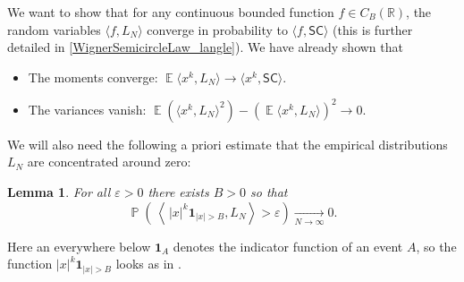 \documentclass[letterpaper,11pt,oneside,reqno]{amsart}
\numberwithin{equation}{section}
\newcommand{\SC}{\mathsf{SC}}
\DeclareMathOperator{\EE}{\mathbb{E}}
\DeclareMathOperator{\PP}{\mathbb{P}}
\newtheorem{lemma}[proposition]{Lemma}
\theoremstyle{definition}
\begin{document}
We want to show that for any continuous bounded function $f\in C_B(\mathbb R)$, the random
variables $\langle f, L_N\rangle$ converge in probability to 
$\langle f, \SC\rangle$ (this is further detailed in \eqref{WignerSemicircleLaw_langle}).
We have already shown that 
\begin{itemize}
	\item The moments converge: $\EE\langle x^{k}, L_N\rangle\to\langle x^k,\SC\rangle$.
	\item The variances
	vanish: 
	$\EE ( \langle x^k , L_N \rangle^2 ) - ( \EE \langle x^k , L_N \rangle )^2 \to0.$
\end{itemize}

We will also need the following a priori estimate that the empirical distributions
$L_N$ are concentrated around zero:
\begin{lemma}\label{lemma:WSCL_truncation}
	For all $ \varepsilon > 0 $ there exists $ B>0 $ so that
	\begin{equation*}
		\PP \left( \, \left \langle \, | x |^k \mathbf{1}_{ | x | > B } , L_N \right \rangle > \varepsilon \right) \xrightarrow[ N \to \infty ]{} 0.
	\end{equation*}
\end{lemma}
Here an everywhere below $\mathbf{1}_{A}$ denotes the indicator function of an event $A$, so the function $| x |^k \mathbf{1}_{ | x | > B }$ looks as in .
\end{document}
